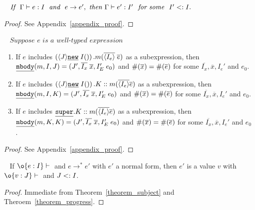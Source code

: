 \begin{theorem}~\label{theorem_subject}
$\textit{If } \ \judgeewf \Gamma {e : I} \; \textit{ and } \ e \rightarrow e',\ 
\textit{then } \judgeewf \Gamma {e' : I'} \ \textit{ for some } \ I' <: I.$
\end{theorem}
\begin{proof}
See Appendix~\ref{appendix_proof}.
\end{proof}

\begin{theorem}[Progress]~\label{theorem_progress}
$\textit{Suppose } e \textit{ is a well-typed expression } $ \\
\begin{enumerate}
\item If $e$ includes $\left(\langle J \rangle\emph{\texttt{new}}\;I()\right).m(\overline{\langle I_e \rangle} \; \overline{e})$ as a subexpression,
    then $ \emph{\texttt{mbody}}(m, I, J) = (J', \overline{I_x} \; \overline{x}, I'_E \; e_0) $ and
         $\#(\overline{x}) = \#(\overline{e})$ for some $\overline{I_x}, \overline{x}, I_e'$ and $e_0$.
\item If $e$ includes $\left(\langle J \rangle\emph{\texttt{new}}\;I()\right).K::m(\overline{\langle I_e \rangle} \overline{e})$ as a subexpression,
    then $ \emph{\texttt{mbody}}(m, I, K) = (J', \overline{I_x} \; \overline{x}, I'_E \; e_0) $ and 
         $\#(\overline{x}) = \#(\overline{e})$ for some $\overline{I_x}, \overline{x}, I_e'$ and $e_0$.
\item If $e$ includes $\emph{\texttt{super}}.K::m(\overline{\langle I_e \rangle} \overline{e})$ as a subexpression,
    then $ \emph{\texttt{mbody}}(m, K, K) = (J', \overline{I_x} \; \overline{x}, I'_E \; e_0) $ and 
         $\#(\overline{x}) = \#(\overline{e})$ for some $\overline{I_x}, \overline{x}, I_e'$ and $e_0$.
\end{enumerate}
\end{theorem}
\begin{proof}
See Appendix~\ref{appendix_proof}.
\end{proof}

\begin{theorem}~\label{theorem_soundness}
If $\judgeewf \o {e : I}$ and $e \to^* e'$ with $e'$ a normal form, then $e'$ is 
a value $v$ with $\judgeewf \o {v:J}$ and $J <: I$.
\end{theorem}
\begin{proof}
Immediate from Theorem~\ref{theorem_subject} and Theroem~\ref{theorem_progress}.
\end{proof}
